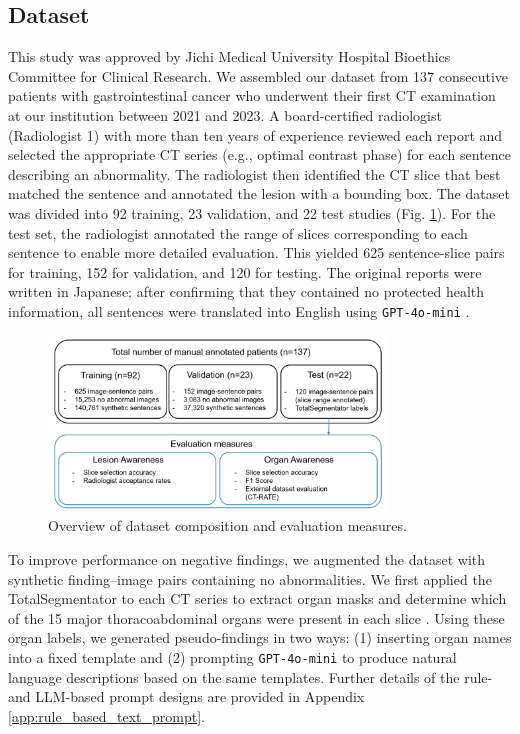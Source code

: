 \documentclass[bioengineering,article,submit,pdftex,moreauthors]{Definitions/mdpi}
\begin{document}
\subsection{Dataset}\label{sec:dataset}
This study was approved by Jichi Medical University Hospital Bioethics Committee for Clinical Research. 
We assembled our dataset from 137 consecutive patients with gastrointestinal cancer who underwent their ﬁrst CT examination at our institution between 2021 and 2023. 
A board-certified radiologist (Radiologist 1) with more than ten years of experience reviewed each report and selected the appropriate CT series (e.g., optimal contrast phase) for each sentence describing an abnormality. 
The radiologist then identified the CT slice that best matched the sentence and annotated the lesion with a bounding box. 
The dataset was divided into 92 training, 23 validation, and 22 test studies (Fig. \ref{fig:dataset_detail}). 
For the test set, the radiologist annotated the range of slices corresponding to each sentence to enable more detailed evaluation. 
This yielded 625 sentence-slice pairs for training, 152 for validation, and 120 for testing. 
The original reports were written in Japanese; after confirming that they contained no protected health information, all sentences were translated into English using \texttt{GPT-4o-mini} \cite{openai_gpt-4_2024}. 


\begin{figure}[ht]
  \centering
  \includegraphics[width=0.8\textwidth]{./figures/dataset_detail_1.png}
  \caption{
    Overview of dataset composition and evaluation measures.
  }
  \label{fig:dataset_detail}
\end{figure}


To improve performance on negative findings, we augmented the dataset with synthetic finding–image pairs containing no abnormalities. 
We first applied the TotalSegmentator to each CT series to extract organ masks and determine which of the 15 major thoracoabdominal organs were present in each slice \cite{wasserthal_totalsegmentator_2023}. 
Using these organ labels, we generated pseudo-findings in two ways: (1) inserting organ names into a fixed template and (2) prompting \texttt{GPT-4o-mini} to produce natural language descriptions based on the same templates. 
Further details of the rule- and LLM-based prompt designs are provided in Appendix \ref{app:rule_based_text_prompt}.
\end{document}
